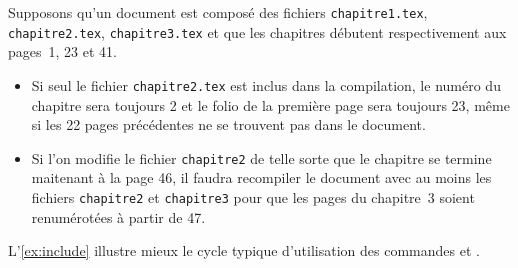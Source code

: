 Supposons qu'un document est composé des fichiers
\verb=chapitre1.tex=, \verb=chapitre2.tex=, \verb=chapitre3.tex= et
que les chapitres débutent respectivement aux pages~1, 23 et 41.
\begin{itemize}
\item Si seul le fichier \verb=chapitre2.tex= est inclus dans la
  compilation, le numéro du chapitre sera toujours 2 et le folio de la
  première page sera toujours 23, même si les 22 pages précédentes ne se
  trouvent pas dans le document.
\item Si l'on modifie le fichier \verb=chapitre2= de telle sorte que
  le chapitre se termine maitenant à la page 46, il faudra recompiler
  le document avec au moins les fichiers \verb=chapitre2=  et
  \verb=chapitre3= pour que les pages du chapitre~3 soient renumérotées
  à partir de 47.
\end{itemize}

L'\autoref{ex:include} illustre mieux le cycle typique
d'utilisation des commandes \verb== et \verb==.




